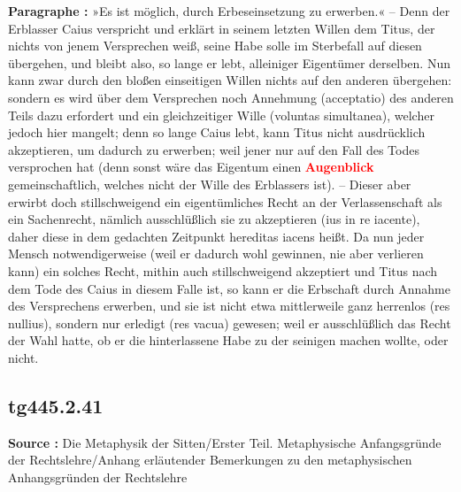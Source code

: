 \documentclass[a4paper,12pt,twoside]{book}
\newcommand{\match}[1]{\textcolor{red}{\textbf{#1}}}
\begin{document}
	\textbf{Paragraphe : }»Es ist möglich, durch Erbeseinsetzung zu erwerben.« – Denn der Erblasser Caius verspricht und erklärt in seinem letzten Willen dem Titus, der nichts von jenem Versprechen weiß, seine Habe solle im Sterbefall auf diesen übergehen, und bleibt also, so lange er lebt, alleiniger Eigentümer derselben. Nun kann zwar durch den bloßen einseitigen Willen nichts auf den anderen übergehen: sondern es wird über dem Versprechen noch Annehmung (acceptatio) des anderen Teils dazu erfordert und ein gleichzeitiger Wille (voluntas simultanea), welcher jedoch hier mangelt; denn so lange Caius lebt, kann Titus nicht ausdrücklich akzeptieren, um dadurch zu erwerben; weil jener nur auf den Fall des Todes versprochen hat (denn sonst wäre das Eigentum einen \match{Augenblick} gemeinschaftlich, welches nicht der Wille des Erblassers ist). – Dieser aber erwirbt doch stillschweigend ein eigentümliches Recht an der Verlassenschaft als ein Sachenrecht, nämlich ausschlüßlich sie zu akzeptieren (ius in re iacente), daher diese in dem gedachten Zeitpunkt hereditas iacens heißt. Da nun jeder Mensch notwendigerweise (weil er dadurch wohl gewinnen, nie aber verlieren kann) ein solches Recht, mithin auch stillschweigend akzeptiert und Titus nach dem Tode des Caius in diesem Falle ist, so kann er die Erbschaft durch Annahme des Versprechens erwerben, und sie ist nicht etwa mittlerweile ganz herrenlos (res nullius),  sondern nur erledigt (res vacua) gewesen; weil er ausschlüßlich das Recht der Wahl hatte, ob er die hinterlassene Habe zu der seinigen machen wollte, oder nicht. 
	
	\subsection*{tg445.2.41} 
	\textbf{Source : }Die Metaphysik der Sitten/Erster Teil. Metaphysische Anfangsgründe der Rechtslehre/Anhang erläutender Bemerkungen zu den metaphysischen Anhangsgründen der Rechtslehre\\  
	
\end{document}
